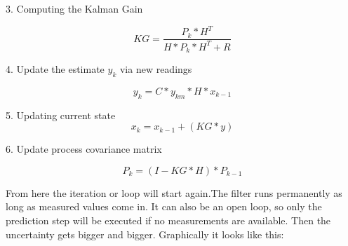 3. Computing the Kalman Gain

\begin{equation}
KG = \frac{P_{k} * H^{T}} 
{H * P_{k}  * H^{T} + R }
\end{equation}


4. Update the estimate $y_k$ via new readings

\begin{equation}
y_k = C * y_{km} * H * x_{k-1}
\end{equation}


5. Updating current state 
\begin{equation}
x_k = x_{k-1} + ( KG * y )
\end{equation}


6. Update process covariance matrix

\begin{equation}
P_{k}= ( I - KG * H) * P_{k-1}
\end{equation}

From here the iteration or loop will start again.The filter runs permanently as long as measured values come in. It can also be an open loop, so only the prediction step will be executed if no measurements are available. Then the uncertainty gets bigger and bigger. 
Graphically it looks like this:

